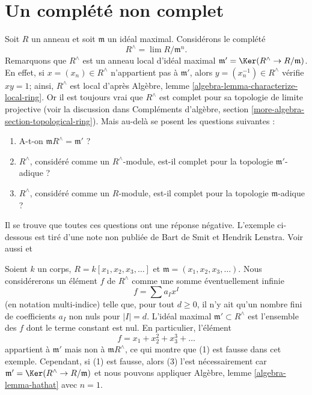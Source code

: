 \section{Un complété non complet}
\label{section-noncomplete-completion}

\noindent
Soit $R$ un anneau et soit $\mathfrak m$ un idéal maximal. Considérons le
complété
$$
R^\wedge = \lim R/\mathfrak m^n.
$$
Remarquons que $R^\wedge$ est un anneau local d'idéal maximal
$\mathfrak m' = \Ker(R^\wedge \to R/\mathfrak m)$.
En effet, si $x = (x_n) \in R^\wedge$ n'appartient pas à $\mathfrak m'$, alors
$y = (x_n^{-1}) \in R^\wedge$ vérifie $xy = 1$; ainsi, $R^\wedge$ est local d'après
Algèbre, lemme \ref{algebra-lemma-characterize-local-ring}. Or il est
toujours vrai que $R^\wedge$ est complet pour sa topologie de limite projective (voir la
discussion dans
Compléments d'algèbre, section \ref{more-algebra-section-topological-ring}).
Mais au-delà se posent les questions suivantes :
\begin{enumerate}
\item A-t-on $\mathfrak m R^\wedge = \mathfrak m'$ ?
\item $R^\wedge$, considéré comme un $R^\wedge$-module, est-il
complet pour la topologie $\mathfrak m'$-adique ?
\item $R^\wedge$, considéré comme un $R$-module, est-il complet pour la topologie $\mathfrak m$-adique ?
\end{enumerate}
Il se trouve que toutes ces questions ont une réponse négative.
L'exemple ci-dessous est tiré d'une note non publiée de
Bart de Smit et Hendrik Lenstra. Voir aussi
\cite[Exercise III.2.12]{Bourbaki-CA} et
\cite[exemple 1.8]{Yekutieli}

\medskip\noindent
Soient $k$ un corps, $R = k[x_1, x_2, x_3, \ldots]$ et
$\mathfrak m = (x_1, x_2, x_3, \ldots)$.
Nous considérerons un élément $f$ de $R^\wedge$ comme une somme éventuellement infinie
$$
f = \sum a_I x^I
$$
(en notation multi-indice) telle que, pour tout $d \geq 0$, il
n'y ait qu'un nombre fini de coefficients $a_I$ non nuls pour $|I| = d$. L'idéal
maximal $\mathfrak m' \subset R^\wedge$ est l'ensemble des $f$ dont le
terme constant est nul. En particulier, l'élément
$$
f = x_1 + x_2^2 + x_3^3 + \ldots
$$
appartient à $\mathfrak m'$ mais non à $\mathfrak m R^\wedge$, ce qui
montre que (1) est fausse dans cet exemple. Cependant, si (1) est
fausse, alors (3) l'est nécessairement car
$\mathfrak m' = \Ker(R^\wedge \to R/\mathfrak m)$
et nous pouvons appliquer
Algèbre, lemme \ref{algebra-lemma-hathat} avec $n = 1$.

